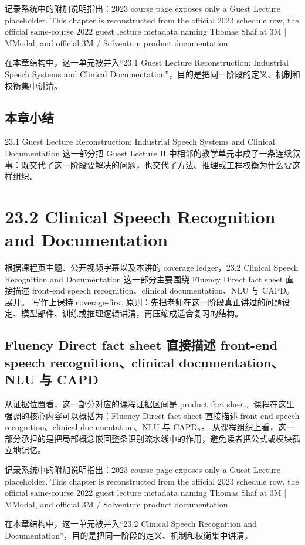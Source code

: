 \documentclass[a4paper]{article}
\begin{document}
记录系统中的附加说明指出：2023 course page exposes only a Guest Lecture placeholder. This chapter is reconstructed from the official 2023 schedule row, the official same-course 2022 guest lecture metadata naming Thomas Shaf at 3M | MModal, and official 3M / Solventum product documentation.

在本章结构中，这一单元被并入“23.1 Guest Lecture Reconstruction: Industrial Speech Systems and Clinical Documentation”，目的是把同一阶段的定义、机制和权衡集中讲清。

\subsection{本章小结}
23.1 Guest Lecture Reconstruction: Industrial Speech Systems and Clinical Documentation 这一部分把 Guest Lecture II 中相邻的教学单元串成了一条连续叙事：既交代了这一阶段要解决的问题，也交代了方法、推理或工程权衡为什么要这样组织。

\section{23.2 Clinical Speech Recognition and Documentation}
根据课程页主题、公开视频字幕以及本讲的 coverage ledger，23.2 Clinical Speech Recognition and Documentation 这一部分主要围绕 Fluency Direct fact sheet 直接描述 front-end speech recognition、clinical documentation、NLU 与 CAPD。 展开。
写作上保持 coverage-first 原则：先把老师在这一阶段真正讲过的问题设定、模型部件、训练或推理逻辑讲清，再压缩成适合复习的结构。

\subsection{Fluency Direct fact sheet 直接描述 front-end speech recognition、clinical documentation、NLU 与 CAPD}
从证据位置看，这一部分对应的课程证据区间是 product fact sheet。课程在这里强调的核心内容可以概括为：Fluency Direct fact sheet 直接描述 front-end speech recognition、clinical documentation、NLU 与 CAPD。。
从课程组织上看，这一部分承担的是把局部概念嵌回整条识别流水线中的作用，避免读者把公式或模块孤立地记忆。

记录系统中的附加说明指出：2023 course page exposes only a Guest Lecture placeholder. This chapter is reconstructed from the official 2023 schedule row, the official same-course 2022 guest lecture metadata naming Thomas Shaf at 3M | MModal, and official 3M / Solventum product documentation.

在本章结构中，这一单元被并入“23.2 Clinical Speech Recognition and Documentation”，目的是把同一阶段的定义、机制和权衡集中讲清。
\end{document}
